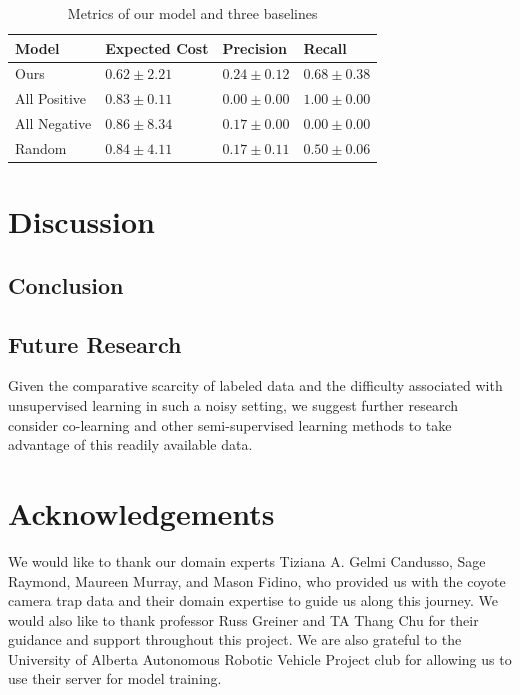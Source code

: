 \documentclass{article}
\begin{document}
\begin{table}
  \caption{Metrics of our model and three baselines}
  \label{results}
  \centering
  \begin{tabular}{llll}
    \topfigrule
    Model     & Expected Cost     & Precision & Recall \\
    \midrule
    Ours & $\mathbf{0.62} \pm 2.21$ & $\mathbf{0.24} \pm 0.12$ & $0.68 \pm 0.38$     \\
    All Positive & $0.83 \pm 0.11$    & $0.00 \pm 0.00$ & $\mathbf{1.00} \pm 0.00$     \\
    All Negative & $0.86 \pm 8.34$    & $0.17 \pm 0.00$ & $0.00 \pm 0.00$     \\
    Random & $0.84 \pm 4.11$    & $0.17 \pm 0.11$ & $0.50 \pm 0.06$     \\
    \bottomrule
  \end{tabular}
\end{table}

\section{Discussion}

\subsection{Conclusion}

\subsection{Future Research}
Given the comparative scarcity of labeled data and the difficulty associated
with unsupervised learning in such a noisy setting, we suggest further research
consider co-learning and other semi-supervised learning methods to take
advantage of this readily available data.

\section{Acknowledgements}
We would like to thank our domain experts Tiziana A. Gelmi Candusso, Sage
Raymond, Maureen Murray, and Mason Fidino, who provided us with the coyote
camera trap data and their domain expertise to guide us along this journey. We
would also like to thank professor Russ Greiner and TA Thang Chu for their
guidance and support throughout this project. We are also grateful to the
University of Alberta Autonomous Robotic Vehicle Project club for allowing us
to use their server for model training.

\clearpage


\end{document}
